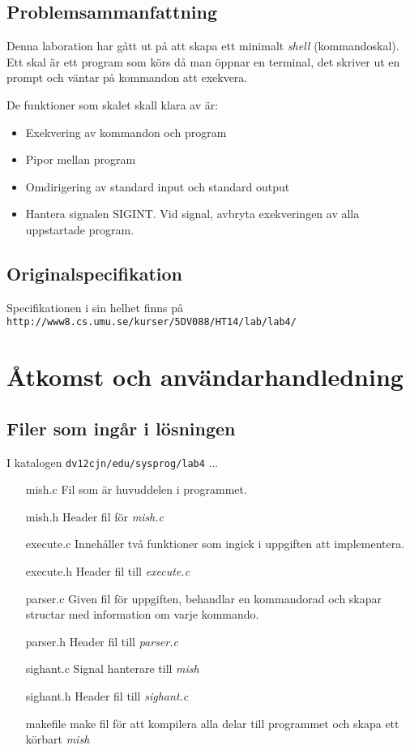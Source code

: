 \documentclass[11pt, titlepage, oneside, a4paper]{article}
\newcommand{\Section}[1]{\section{#1}\vspace{-8pt}}
\newcommand{\Subsection}[1]{\vspace{-4pt}\subsection{#1}\vspace{-8pt}}
\def\username{dv12cjn}
\def\path{edu/sysprog/lab4}
\def\fullpath{\raisebox{1pt}{$\scriptstyle \sim$}\username/\path}
\begin{document}
		\Subsection{Problemsammanfattning}
		Denna laboration har gått ut på att skapa ett minimalt \emph{shell} (kommandoskal). Ett skal är ett program som körs
		då man öppnar en terminal, det skriver ut en prompt och väntar på kommandon att exekvera. 
		
		De funktioner som skalet skall klara av är:
		\begin{itemize}
		 \item Exekvering av kommandon och program
		 \item Pipor mellan program
		 \item Omdirigering av standard input och standard output
		 \item Hantera signalen SIGINT. Vid signal, avbryta exekveringen av alla uppstartade program.
		\end{itemize}

		\Subsection{Originalspecifikation}
			Specifikationen i sin helhet finns på\\
                        \verb!http://www8.cs.umu.se/kurser/5DV088/HT14/lab/lab4/!

	\Section{Åtkomst och användarhandledning}
		
		\Subsection{Filer som ingår i lösningen}
			I katalogen \texttt{\fullpath} ...
		
		\begin{itemize} 
		 \item[mish.c] Fil som är huvuddelen i programmet.
		 \item[mish.h] Header fil för \emph{mish.c}
		 \item[execute.c] Innehåller två funktioner som ingick i uppgiften att implementera.
		 \item[execute.h] Header fil till \emph{execute.c}
		 \item[parser.c] Given fil för uppgiften, behandlar en kommandorad och skapar structar med information om varje kommando.
		 \item[parser.h] Header fil till \emph{parser.c}
		 \item[sighant.c] Signal hanterare till \emph{mish}
		 \item[sighant.h] Header fil till \emph{sighant.c}
		 \item[makefile] make fil för att kompilera alla delar till programmet och skapa ett körbart \emph{mish}
		\end{itemize}
\end{document}
